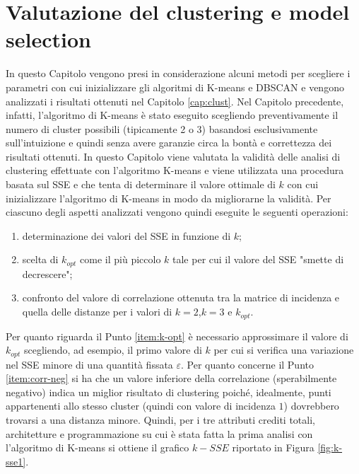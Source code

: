 \documentclass[12pt]{article}
\begin{document}
\section{Valutazione del clustering e model selection}
\label{cap:val-clust}
In questo Capitolo vengono presi in considerazione alcuni metodi per scegliere i parametri con cui inizializzare gli algoritmi di K-means e DBSCAN e vengono analizzati i risultati ottenuti nel Capitolo \ref{cap:clust}.
Nel Capitolo precedente, infatti, l'algoritmo di K-means è stato eseguito scegliendo preventivamente il numero di cluster possibili (tipicamente 2 o 3) basandosi esclusivamente sull'intuizione e quindi senza avere garanzie circa la bontà e correttezza dei risultati ottenuti. In questo Capitolo viene valutata la validità delle analisi di clustering effettuate con l'algoritmo K-means e viene utilizzata una procedura basata sul SSE e che tenta di determinare il valore ottimale di $k$ con cui inizializzare l'algoritmo di K-means in modo da migliorarne la validità. Per ciascuno degli aspetti analizzati vengono quindi eseguite le seguenti operazioni:

\begin{enumerate}
\item determinazione dei valori del SSE in funzione di $k$;
\item \label{item:k-opt} scelta di $k_{opt}$ come il più piccolo $k$ tale per cui il valore del SSE "smette di decrescere";
\item \label{item:corr-neg} confronto del valore di correlazione ottenuta tra la matrice di incidenza e quella delle distanze per i valori di $k=2$,$k=3$ e $k_{opt}$.
\end{enumerate}

Per quanto riguarda il Punto \ref{item:k-opt} è necessario approssimare il valore di $k_{opt}$ scegliendo, ad esempio, il primo valore di $k$ per cui si verifica una variazione nel SSE minore di una quantità fissata $\varepsilon$. Per quanto concerne il Punto \ref{item:corr-neg} si ha che un valore inferiore della correlazione (sperabilmente negativo) indica un miglior risultato di clustering poiché, idealmente, punti appartenenti allo stesso cluster (quindi con valore di incidenza $1$) dovrebbero trovarsi a una distanza minore. Quindi, per i tre attributi crediti totali, architetture e programmazione su cui è stata fatta la prima analisi con l'algoritmo di K-means si ottiene il grafico $k-SSE$ riportato in Figura \ref{fig:k-sse1}.
\end{document}
